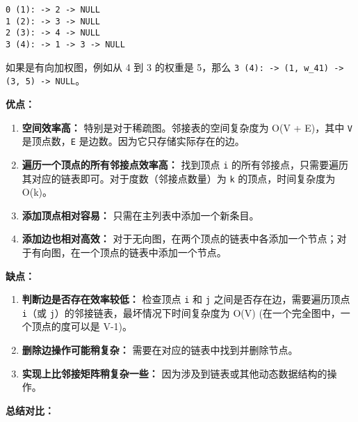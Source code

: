 \begin{lstlisting}
0 (1): -> 2 -> NULL
1 (2): -> 3 -> NULL
2 (3): -> 4 -> NULL
3 (4): -> 1 -> 3 -> NULL
\end{lstlisting}
如果是有向加权图，例如从 4 到 3 的权重是 5，那么 \lstinline{3 (4): -> (1, w_41) -> (3, 5) -> NULL}。

\textbf{优点：}

\begin{enumerate}
	\item \textbf{空间效率高：} 特别是对于稀疏图。邻接表的空间复杂度为 O(V + E)，其中 \lstinline{V} 是顶点数，\lstinline{E} 是边数。因为它只存储实际存在的边。
	\item \textbf{遍历一个顶点的所有邻接点效率高：} 找到顶点 \lstinline{i} 的所有邻接点，只需要遍历其对应的链表即可。对于度数（邻接点数量）为 \lstinline{k} 的顶点，时间复杂度为 O(k)。
	\item \textbf{添加顶点相对容易：} 只需在主列表中添加一个新条目。
	\item \textbf{添加边也相对高效：} 对于无向图，在两个顶点的链表中各添加一个节点；对于有向图，在一个顶点的链表中添加一个节点。
\end{enumerate}

\textbf{缺点：}

\begin{enumerate}
	\item \textbf{判断边是否存在效率较低：} 检查顶点 \lstinline{i} 和 \lstinline{j} 之间是否存在边，需要遍历顶点 \lstinline{i}（或 \lstinline{j}）的邻接链表，最坏情况下时间复杂度为 O(V) (在一个完全图中，一个顶点的度可以是 V-1)。
	\item \textbf{删除边操作可能稍复杂：} 需要在对应的链表中找到并删除节点。
	\item \textbf{实现上比邻接矩阵稍复杂一些：} 因为涉及到链表或其他动态数据结构的操作。
\end{enumerate}


\textbf{总结对比：}

